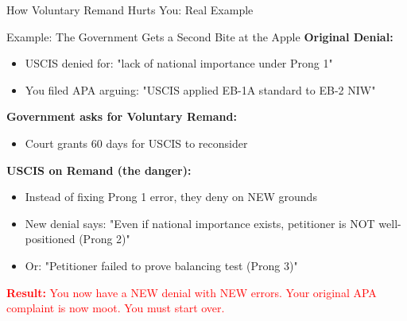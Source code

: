 \documentclass[11pt]{beamer}
\begin{document}
	\begin{frame}{How Voluntary Remand Hurts You: Real Example}
		\scriptsize
		\begin{block}{Example: The Government Gets a Second Bite at the Apple}
			\textbf{Original Denial:}
			\begin{itemize}
				\item USCIS denied for: "lack of national importance under Prong 1"
				\item You filed APA arguing: "USCIS applied EB-1A standard to EB-2 NIW"
			\end{itemize}
			\textbf{Government asks for Voluntary Remand:}
			\begin{itemize}
				\item Court grants 60 days for USCIS to reconsider
			\end{itemize}
			\textbf{USCIS on Remand (the danger):}
			\begin{itemize}
				\item Instead of fixing Prong 1 error, they deny on NEW grounds
				\item New denial says: "Even if national importance exists, petitioner is NOT well-positioned (Prong 2)"
				\item Or: "Petitioner failed to prove balancing test (Prong 3)"
			\end{itemize}
			\textcolor{red}{\textbf{Result:} You now have a NEW denial with NEW errors.}
			\textcolor{red}{Your original APA complaint is now moot. You must start over.}
		\end{block}
	\end{frame}
	
\end{document}
